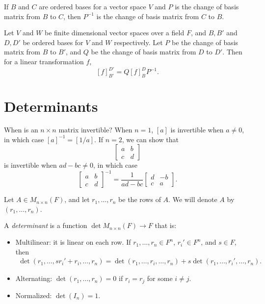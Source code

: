 \begin{lemma}
    If $B$ and $C$ are ordered bases for a vector space $V$ and $P$ is the change of basis matrix from $B$ to $C$, then $P^{-1}$ is the change of basis matrix from $C$ to $B$.
\end{lemma}

\begin{thm}
    Let $V$ and $W$ be finite dimensional vector spaces over a field $F$, and $B, B'$ and $D, D'$ be ordered bases for $V$ and $W$ respectively. Let $P$ be the change of basis matrix from $B$ to $B'$, and $Q$ be the change of basis matrix from $D$ to $D'$. Then for a linear transformation $f$,
    \[[f]_{B'}^{D'} = Q[f]_{B}^{D}P^{-1}.\]
\end{thm}

\section{Determinants}

When is an $n \times n$ matrix invertible? When $n = 1$, $[a]$ is invertible when $a \neq 0$, in which case $[a]^{-1} = [1/a]$. If $n = 2$, we can show that
\[\begin{bmatrix}
    a & b \\
    c & d
\end{bmatrix}\] is invertible when $ad - bc \neq 0$, in which case
\[\begin{bmatrix}
    a & b \\
    c & d
\end{bmatrix}^{-1} = \frac{1}{ad - bc}\begin{bmatrix}
    d & -b \\
    c & a
\end{bmatrix}.\]

\begin{rmk}
    Let $A \in M_{n \times n}(F)$, and let $r_1, \ldots, r_n$ be the rows of $A$. We will denote $A$ by $(r_1, \ldots, r_n)$.
\end{rmk}

\begin{defn}\label{det-properties}
    A \emph{determinant} is a function $\det M_{n \times n}(F) \to F$ that is:
    \begin{itemize}
        \item Multilinear: it is linear on each row. If $r_1, \ldots, r_n \in F^n$, $r_i' \in F^n$, and $s \in F$, then
        \begin{align*}
            \det\left(r_1, \ldots, sr_i' + r_i, \ldots, r_n\right) = \det\left(r_1, \ldots, r_i, \ldots, r_n\right) + s\det\left(r_1, \ldots, r_i', \ldots, r_n\right).
        \end{align*}
        \item Alternating: $\det(r_1, \ldots, r_n) = 0$ if $r_i = r_j$ for some $i \neq j$.
        \item Normalized: $\det(I_n) = 1$.
    \end{itemize}
\end{defn}

